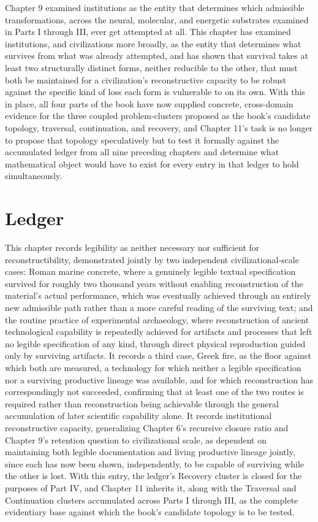 \documentclass[11pt]{book}
\begin{document}
Chapter 9 examined institutions as the entity that determines which admissible transformations, across the neural, molecular, and energetic substrates examined in Parts I through III, ever get attempted at all. This chapter has examined institutions, and civilizations more broadly, as the entity that determines what survives from what was already attempted, and has shown that survival takes at least two structurally distinct forms, neither reducible to the other, that must both be maintained for a civilization's reconstructive capacity to be robust against the specific kind of loss each form is vulnerable to on its own. With this in place, all four parts of the book have now supplied concrete, cross-domain evidence for the three coupled problem-clusters proposed as the book's candidate topology, traversal, continuation, and recovery, and Chapter 11's task is no longer to propose that topology speculatively but to test it formally against the accumulated ledger from all nine preceding chapters and determine what mathematical object would have to exist for every entry in that ledger to hold simultaneously.

\section{Ledger}

This chapter records legibility as neither necessary nor sufficient for reconstructibility, demonstrated jointly by two independent civilizational-scale cases: Roman marine concrete, where a genuinely legible textual specification survived for roughly two thousand years without enabling reconstruction of the material's actual performance, which was eventually achieved through an entirely new admissible path rather than a more careful reading of the surviving text; and the routine practice of experimental archaeology, where reconstruction of ancient technological capability is repeatedly achieved for artifacts and processes that left no legible specification of any kind, through direct physical reproduction guided only by surviving artifacts. It records a third case, Greek fire, as the floor against which both are measured, a technology for which neither a legible specification nor a surviving productive lineage was available, and for which reconstruction has correspondingly not succeeded, confirming that at least one of the two routes is required rather than reconstruction being achievable through the general accumulation of later scientific capability alone. It records institutional reconstructive capacity, generalizing Chapter 6's recursive closure ratio and Chapter 9's retention question to civilizational scale, as dependent on maintaining both legible documentation and living productive lineage jointly, since each has now been shown, independently, to be capable of surviving while the other is lost. With this entry, the ledger's Recovery cluster is closed for the purposes of Part IV, and Chapter 11 inherits it, along with the Traversal and Continuation clusters accumulated across Parts I through III, as the complete evidentiary base against which the book's candidate topology is to be tested.
\end{document}

